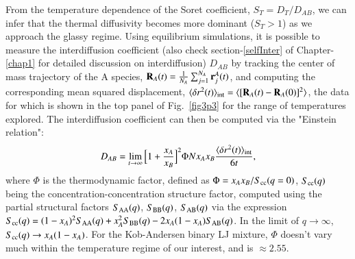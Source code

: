 From the temperature dependence of the Soret coefficient, $S_T=D_T/D_{AB}$, we can infer that the thermal diffusivity becomes more dominant ($S_T > 1$) as we approach the glassy regime. Using equilibrium simulations, it is possible to measure the interdiffusion coefficient (also check section-\ref{selfInter} of Chapter-\ref{chap1} for detailed discussion on interdiffusion) $D_{AB}$ %
by tracking the center of mass trajectory of the A species, ${\bf R}_A(t)=\frac{1}{N_{A}}\sum_{j=1}^{N_A}{\bf r}_j^{A}(t)$, and computing the corresponding mean squared displacement, $\langle\delta{r^2(t)}\rangle_{\rm int}=\langle[{\bf R}_A(t)-{\bf R}_A(0)]^2\rangle$, the data for which is shown in the top panel  of Fig.~\ref{fig3p3} for the range of temperatures explored. The interdiffusion coefficient can then be computed \cite{interdiff} via the "Einstein relation": $$D_{AB}=\lim_{t\rightarrow\infty}\Big{[}1+\frac{x_A}{x_B}\Big{]}^2\Phi{Nx_Ax_B}\frac{\langle\delta{r^2(t)}\rangle_{\rm int}}{6t},$$ where $\Phi$ is the thermodynamic factor, defined as $\Phi=x_Ax_B/S_{\rm cc}(q=0)$, $S_{\rm cc}(q)$ being  the concentration-concentration structure factor, computed using  the partial structural factors $S_{\rm AA}(q)$, $S_{\rm BB}(q)$, $S_{\rm AB}(q)$ via the expression  $S_{\rm cc}(q)=(1-x_A)^2S_{\rm AA}(q)+x_A^2S_{\rm BB}(q)-2x_A(1-x_A)S_{\rm AB}(q)$.  In the limit of  $q\rightarrow{\infty}$, $S_{\rm cc}(q)\rightarrow{x_A(1-x_A)}$. For the Kob-Andersen binary LJ mixture, $\Phi$ doesn't vary much within the temperature regime of our interest, and is $\approx 2.55$.

